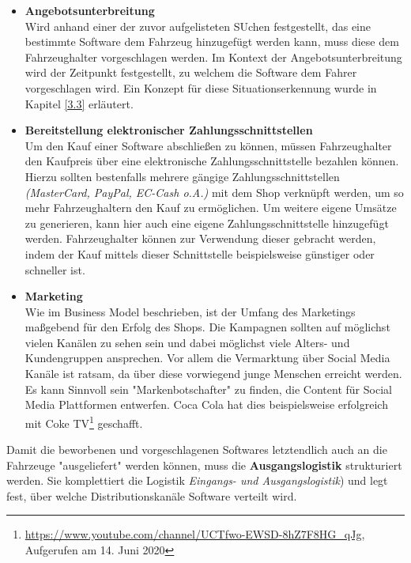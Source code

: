 \begin{itemize}
	\item[] \hspace{-0.6cm} \textbf{Angebotsunterbreitung}\\
	Wird anhand einer der zuvor aufgelisteten SUchen festgestellt, das eine bestimmte Software dem Fahrzeug hinzugefügt werden kann, muss diese dem Fahrzeughalter vorgeschlagen werden. Im Kontext der Angebotsunterbreitung wird der Zeitpunkt festgestellt, zu welchem die Software dem Fahrer vorgeschlagen wird. Ein Konzept für diese Situationserkennung wurde in Kapitel \ref{3.3} erläutert.
	
	\item[] \hspace{-0.6cm} \textbf{Bereitstellung elektronischer Zahlungsschnittstellen}\\
	Um den Kauf einer Software abschließen zu können, müssen Fahrzeughalter den Kaufpreis über eine elektronische Zahlungsschnittstelle bezahlen können. Hierzu sollten bestenfalls mehrere gängige Zahlungsschnittstellen \textit{(MasterCard, PayPal, EC-Cash o.A.)} mit dem Shop verknüpft werden, um so mehr Fahrzeughaltern den Kauf zu ermöglichen. Um weitere eigene Umsätze zu generieren, kann hier auch eine eigene Zahlungsschnittstelle hinzugefügt werden. Fahrzeughalter können zur Verwendung dieser gebracht werden, indem der Kauf mittels dieser Schnittstelle beispielsweise günstiger oder schneller ist.
	
	\item[] \hspace{-0.6cm} \textbf{Marketing}\\
	Wie im Business Model beschrieben, ist der Umfang des Marketings maßgebend für den Erfolg des Shops. Die Kampagnen sollten auf möglichst vielen Kanälen zu sehen sein und dabei möglichst viele Alters- und Kundengruppen ansprechen. Vor allem die Vermarktung über Social Media Kanäle ist ratsam, da über diese vorwiegend junge Menschen erreicht werden. Es kann Sinnvoll sein "Markenbotschafter" zu finden, die Content für Social Media Plattformen entwerfen. Coca Cola hat dies beispielsweise erfolgreich mit Coke TV\footnote{\url{https://www.youtube.com/channel/UCTfwo-EWSD-8hZ7F8HG_qJg}, Aufgerufen am 14. Juni 2020} geschafft.
\end{itemize}
Damit die beworbenen und vorgeschlagenen Softwares letztendlich auch an die Fahrzeuge "ausgeliefert" werden können, muss die \textbf{Ausgangslogistik} strukturiert werden. Sie komplettiert die Logistik \textit{Eingangs- und Ausgangslogistik}) und legt fest, über welche Distributionskanäle Software verteilt wird.
